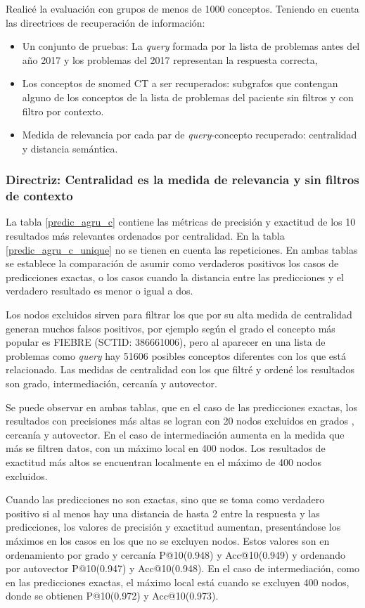 Realicé la evaluación con grupos de menos de 1000 conceptos. Teniendo en cuenta las directrices de recuperación de información: 
\begin{itemize}
\item Un conjunto de pruebas: La \textit{query} formada por la lista de problemas antes del año 2017 y los problemas del 2017 representan la respuesta correcta,
\item Los conceptos de snomed CT a ser recuperados: subgrafos que contengan alguno de los conceptos de la lista de problemas del paciente sin filtros y con filtro por contexto.
\item  Medida de relevancia por cada par de \textit{query}-concepto recuperado: centralidad y distancia semántica.
\end{itemize}

\subsubsection{Directriz: Centralidad es la medida de relevancia y sin filtros de contexto}

La tabla \ref{predic_agru_c} contiene las métricas de precisión y exactitud de los 10  resultados más relevantes ordenados por centralidad. En la tabla \ref{predic_agru_c_unique} no se tienen en cuenta las repeticiones. En ambas tablas se establece la comparación de asumir como verdaderos positivos los casos de predicciones exactas, o los casos cuando la distancia entre las predicciones y el verdadero resultado es menor o igual a dos. 

Los nodos excluidos sirven para filtrar los que por su alta medida de centralidad generan muchos falsos positivos, por ejemplo según el grado el concepto más popular es FIEBRE (SCTID: 386661006), pero al aparecer en una lista de problemas como \textit{query} hay \num{51606} posibles conceptos diferentes con los que está relacionado. Las medidas de centralidad con los que filtré y ordené los resultados son grado, intermediación, cercanía y autovector. 

Se puede observar en ambas tablas, que en el caso de las predicciones exactas, los resultados con precisiones más altas se logran con 20 nodos excluidos en grados , cercanía y autovector. En el caso de intermediación aumenta en la medida que más se filtren datos, con un máximo local en 400 nodos. Los resultados de exactitud más altos se encuentran localmente en el máximo de 400 nodos excluidos.

Cuando las predicciones no son exactas, sino que se toma como verdadero positivo si al menos hay una distancia de hasta 2 entre la respuesta y las predicciones, los valores de precisión y exactitud aumentan, presentándose los máximos en los casos en los que no se excluyen nodos. Estos valores son en ordenamiento por grado y cercanía P@10(\num{0,948}) y Acc@10(\num{0,949}) y ordenando por autovector P@10(\num{0,947}) y Acc@10(\num{0,948}). En el caso de intermediación, como en las predicciones exactas, el máximo local está cuando se excluyen 400 nodos, donde se obtienen P@10(\num{0,972}) y Acc@10(\num{0,973}). 

